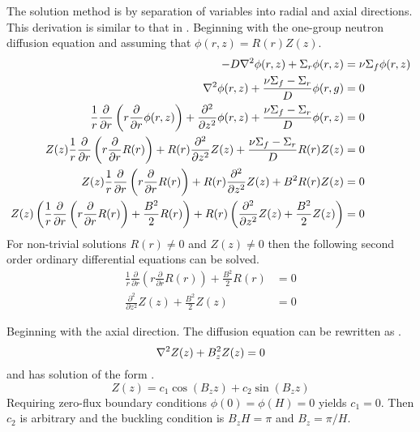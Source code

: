   The solution method is by separation of variables into radial and axial 
  directions. This derivation is similar to that in .
  Beginning with the one-group neutron diffusion equation  
  and assuming that  $\phi(r,z) = R(r) Z(z)$.
  \begin{align}
    -D \mathbf{\nabla}^2 \phi(r,z) + \Sigma_r \phi(r,z) &= \nu \Sigma_f \phi(r,z) \\
    \mathbf{\nabla}^2 \phi(r,z) + \frac{\nu\Sigma_f - \Sigma_r}{D} \phi(r,g) &= 0 \\
    \frac{1}{r} \frac{\partial}{\partial r} \left( r \frac{\partial}{\partial r}
      \phi(r,z) \right) + \frac{\partial^2}{\partial z^2} \phi(r,z) +
      \frac{\nu\Sigma_f - \Sigma_r}{D} \phi(r,z) &= 0 \\
    Z(z) \frac{1}{r} \frac{\partial}{\partial r} \left( r 
      \frac{\partial}{\partial r} R(r) \right) + 
      R(r) \frac{\partial^2}{\partial z^2} Z(z) + 
      \frac{\nu\Sigma_f - \Sigma_r}{D} R(r) Z(z) &= 0 \\
    Z(z) \frac{1}{r} \frac{\partial}{\partial r} \left( r 
      \frac{\partial}{\partial r} R(r) \right) + 
      R(r) \frac{\partial^2}{\partial z^2} Z(z) + 
      B^2 R(r) Z(z) &= 0 \\
    Z(z) \left( \frac{1}{r} \frac{\partial}{\partial r} \left( r 
      \frac{\partial}{\partial r} R(r) \right) + \frac{B^2}{2} R(r) \right) + 
      R(r) \left( \frac{\partial^2}{\partial z^2} Z(z) + \frac{B^2}{2} Z(z) 
      \right) &= 0
  \end{align}
  For non-trivial solutions $R(r) \ne 0$ and $Z(z) \ne 0$ then the following
  second order ordinary differential equations can be solved.
  \begin{align}
    \label{eq:cyl_radialR}
    \frac{1}{r} \frac{\partial}{\partial r} \left( r \frac{\partial}{\partial r}
      R(r) \right) + \frac{B^2}{2} R(r) &= 0 \\
    \label{eq:cyl_axialZ}
    \frac{\partial^2}{\partial z^2} Z(z) + \frac{B^2}{2} Z(z) &= 0
  \end{align}
  
  Beginning with the axial direction. The diffusion equation can be rewritten as 
  .
  \begin{equation} \label{eq:simplediffusion}
    \mathbf{\nabla}^2 Z(z) + B_z^2 Z(z) = 0
  \end{equation}
  and has solution of the form .
  \begin{equation} \label{eq:cyl_axial}
    Z(z) = c_1 \cos(B_z z) + c_2 \sin(B_z z)
  \end{equation}
  Requiring zero-flux boundary conditions $\phi(0)=\phi(H)=0$ yields $c_1=0$. 
  Then $c_2$ is arbitrary and the buckling condition is $B_zH=\pi$ and $B_z=\pi/H$.
  
